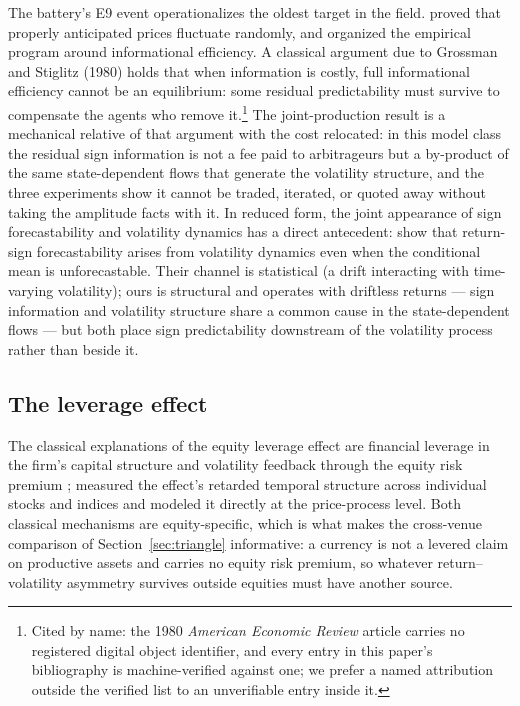\documentclass[11pt]{article}
\begin{document}
The battery's E9 event operationalizes the oldest target in the field.
\citet{samuelson1965} proved that properly anticipated prices fluctuate
randomly, and \citet{fama1970} organized the empirical program around
informational efficiency. A classical argument due to Grossman and
Stiglitz (1980) holds that when information
is costly, full informational efficiency cannot be an equilibrium: some
residual predictability must survive to compensate the agents who remove
it.\footnote{Cited by name: the 1980 \emph{American Economic Review}
article carries no registered digital object identifier, and every entry
in this paper's bibliography is machine-verified against one; we prefer
a named attribution outside the verified list to an unverifiable entry
inside it.} The joint-production result is a mechanical relative of that
argument with the cost relocated: in this model class the residual sign
information is not a fee paid to arbitrageurs but a by-product of the same
state-dependent flows that generate the volatility structure, and the three
experiments show it cannot be traded, iterated, or quoted away without taking
the amplitude facts with it. In reduced form, the joint appearance of
sign forecastability and volatility dynamics has a direct antecedent:
\citet{christoffersen2006} show that return-sign forecastability arises
from volatility dynamics even when the conditional mean is
unforecastable. Their channel is statistical (a drift interacting with
time-varying volatility); ours is structural and operates with driftless
returns --- sign information and volatility structure share a common
cause in the state-dependent flows --- but both place sign
predictability downstream of the volatility process rather than beside
it.

\subsection{The leverage effect}
\label{sec:related:leverage}

The classical explanations of the equity leverage effect are financial
leverage in the firm's capital structure \citep{christie1982} and
volatility feedback through the equity risk premium \citep{bekaert2000};
\citet{bouchaud2001} measured the effect's retarded temporal structure
across individual stocks and indices and modeled it directly at the
price-process level. Both classical mechanisms are equity-specific, which
is what makes the cross-venue comparison of Section~\ref{sec:triangle}
informative: a currency is not a levered claim on productive assets and
carries no equity risk premium, so whatever return--volatility asymmetry
survives outside equities must have another source.
\end{document}
